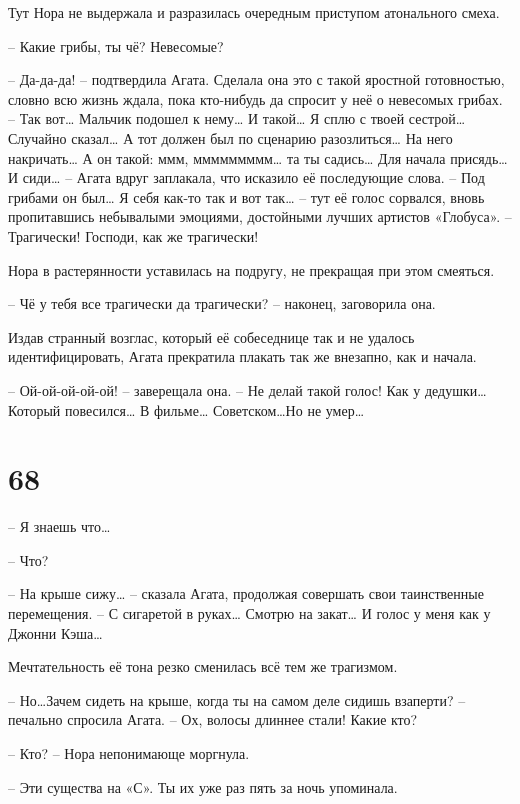 \documentclass[
  a5paperpaper,
  DIV=11,
  numbers=noendperiod]{scrreprt}
\begin{document}
Тут Нора не выдержала и разразилась очередным приступом атонального
смеха.

-- Какие грибы, ты чё? Невесомые?

-- Да-да-да! -- подтвердила Агата. Сделала она это с такой яростной
готовностью, словно всю жизнь ждала, пока кто-нибудь да спросит у неё о
невесомых грибах. -- Так вот\ldots{} Мальчик подошел к нему\ldots{} И
такой\ldots{} Я сплю с твоей сестрой\ldots{} Случайно сказал\ldots{} А
тот должен был по сценарию разозлиться\ldots{} На него накричать\ldots{}
А он такой: ммм, ммммммммм\ldots{} та ты садись\ldots{} Для начала
присядь\ldots{} И сиди\ldots{} -- Агата вдруг заплакала, что исказило её
последующие слова. -- Под грибами он был\ldots{} Я себя как-то так и вот
так\ldots{} -- тут её голос сорвался, вновь пропитавшись небывалыми
эмоциями, достойными лучших артистов «Глобуса». -- Трагически! Господи,
как же трагически!

Нора в растерянности уставилась на подругу, не прекращая при этом
смеяться.

-- Чё у тебя все трагически да трагически? -- наконец, заговорила она.

Издав странный возглас, который её собеседнице так и не удалось
идентифицировать, Агата прекратила плакать так же внезапно, как и
начала.

-- Ой-ой-ой-ой-ой! -- заверещала она. -- Не делай такой голос! Как у
дедушки\ldots{} Который повесился\ldots{} В фильме\ldots{}
Советском\ldots Но не умер\ldots{}

\section*{68}\label{68}


-- Я знаешь что\ldots{}

-- Что?

-- На крыше сижу\ldots{} -- сказала Агата, продолжая совершать свои
таинственные перемещения. -- С сигаретой в руках\ldots{} Смотрю на
закат\ldots{} И голос у меня как у Джонни Кэша\ldots{}

Мечтательность её тона резко сменилась всё тем же трагизмом.

-- Но\ldots Зачем сидеть на крыше, когда ты на самом деле сидишь
взаперти? -- печально спросила Агата. -- Ох, волосы длиннее стали! Какие
кто?

-- Кто? -- Нора непонимающе моргнула.

-- Эти существа на «С». Ты их уже раз пять за ночь упоминала.
\end{document}
